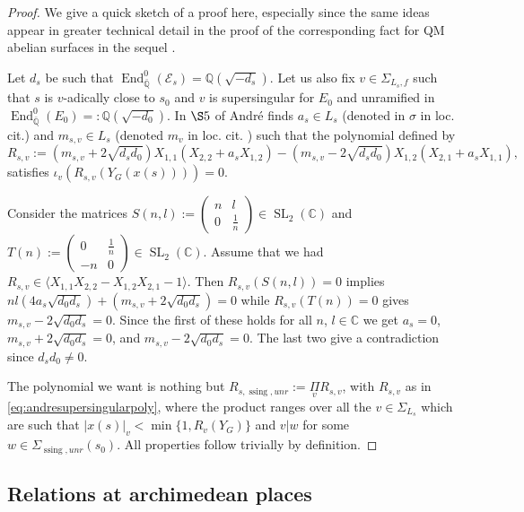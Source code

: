 \documentclass[12pt,twoside,a4paper]{article}
\theoremstyle{plain}%
\DeclareMathOperator{\End}{End}
\DeclareMathOperator{\SL}{SL}
\DeclareMathOperator{\ssing}{ssing}
\newcommand{\C}{\mathbb{C}}
\newcommand{\Q}{\mathbb{Q}}
\newcommand{\CE}{\mathcal{E}}
\newcommand{\unr}{unr}
\begin{document}
\begin{proof}
	We give a quick sketch of a proof here, especially since the same ideas appear in greater technical detail in the proof of the corresponding fact for QM abelian surfaces in the sequel \cite{papaspadicpart3}. 
	
	Let $d_s$ be such that $\End_{\bar{\Q}}^{0}(\CE_s)=\Q(\sqrt{-d_s})$. Let us also fix $v\in \Sigma_{L_s,f}$ such that $s$ is $v$-adically close to $s_0$ and $v$ is supersingular for $E_0$ and unramified in $\End_{\bar{\Q}}^{0}(E_0)=:\Q(\sqrt{-d_0})$. In $\S 5$ of \cite{andremots} Andr\'e finds $a_s\in L_s$ (denoted in $\sigma$ in loc. cit.) and $m_{s,v}\in L_s$ (denoted $m_v$ in loc. cit. ) such that the polynomial defined by \begin{equation}\label{eq:andresupersingularpoly}
		R_{s,v}:=(m_{s,v}+2\sqrt{d_sd_0})X_{1,1}(X_{2,2}+a_sX_{{1,2}})-(m_{s,v}-2\sqrt{d_sd_0})X_{1,2}(X_{2,1}+a_sX_{1,1}),
	\end{equation}satisfies $\iota_v(R_{s,v}(Y_G(x(s))))=0$.
	
	Consider the matrices $S(n,l):=\begin{pmatrix}n&l\\0&\frac{1}{n}\end{pmatrix}\in \SL_2(\C)$ and  $T(n):=\begin{pmatrix}0&\frac{1}{n}\\-n&0\end{pmatrix}\in \SL_2(\C)$. Assume that we had $R_{s,v}\in \langle X_{1,1}X_{2,2}-X_{1,2}X_{2,1}-1 \rangle$. Then $R_{s,v}(S(n,l))=0$ implies $nl(4a_s\sqrt{d_0d_s})+(m_{s,v}+2\sqrt{d_0d_s})=0$ while $R_{s,v}(T(n))=0$ gives $m_{s,v}-2\sqrt{d_0d_s}=0$. Since the first of these holds for all $n$, $l\in \C$ we get $a_s=0$, $m_{s,v}+2\sqrt{d_0d_s}=0$, and  $m_{s,v}-2\sqrt{d_0d_s}=0$. The last two give a contradiction since $d_sd_0\neq 0$. 
	
	The polynomial we want is nothing but $R_{s,\ssing,\unr}:=\underset{v}{\Pi} R_{s,v}$, with $R_{s,v}$ as in \eqref{eq:andresupersingularpoly}, where the product ranges over all the $v\in\Sigma_{L_s}$ which are such that $|x(s)|_v<\min\{1,R_v(Y_G)\}$ and $v|w$ for some $w\in \Sigma_{\ssing,\unr}(s_0)$. All properties follow trivially by definition.\end{proof}

\subsection{Relations at archimedean places}\label{section:cmarchimedean}
\end{document}
